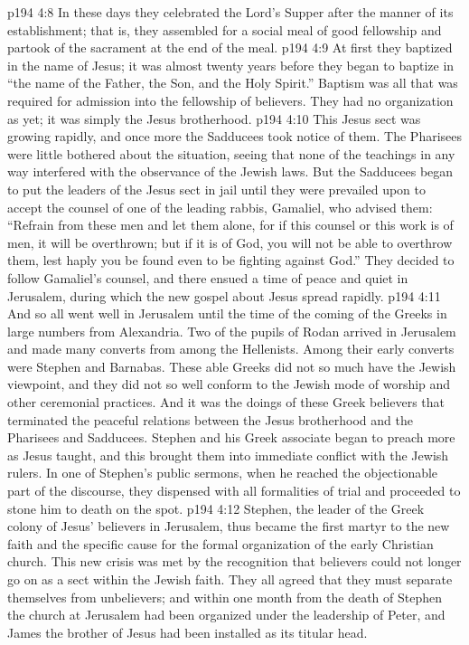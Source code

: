 \vs p194 4:8 \pc In these days they celebrated the Lord’s Supper after the manner of its establishment; that is, they assembled for a social meal of good fellowship and partook of the sacrament at the end of the meal.
\vs p194 4:9 \pc At first they baptized in the name of Jesus; it was almost twenty years before they began to baptize in “the name of the Father, the Son, and the Holy Spirit.” Baptism was all that was required for admission into the fellowship of believers. They had no organization as yet; it was simply the Jesus brotherhood.
\vs p194 4:10 \pc This Jesus sect was growing rapidly, and once more the Sadducees took notice of them. The Pharisees were little bothered about the situation, seeing that none of the teachings in any way interfered with the observance of the Jewish laws. But the Sadducees began to put the leaders of the Jesus sect in jail until they were prevailed upon to accept the counsel of one of the leading rabbis, Gamaliel, who advised them: “Refrain from these men and let them alone, for if this counsel or this work is of men, it will be overthrown; but if it is of God, you will not be able to overthrow them, lest haply you be found even to be fighting against God.” They decided to follow Gamaliel’s counsel, and there ensued a time of peace and quiet in Jerusalem, during which the new gospel about Jesus spread rapidly.
\vs p194 4:11 And so all went well in Jerusalem until the time of the coming of the Greeks in large numbers from Alexandria. Two of the pupils of Rodan arrived in Jerusalem and made many converts from among the Hellenists. Among their early converts were Stephen and Barnabas. These able Greeks did not so much have the Jewish viewpoint, and they did not so well conform to the Jewish mode of worship and other ceremonial practices. And it was the doings of these Greek believers that terminated the peaceful relations between the Jesus brotherhood and the Pharisees and Sadducees. Stephen and his Greek associate began to preach more as Jesus taught, and this brought them into immediate conflict with the Jewish rulers. In one of Stephen’s public sermons, when he reached the objectionable part of the discourse, they dispensed with all formalities of trial and proceeded to stone him to death on the spot.
\vs p194 4:12 Stephen, the leader of the Greek colony of Jesus’ believers in Jerusalem, thus became the first martyr to the new faith and the specific cause for the formal organization of the early Christian church. This new crisis was met by the recognition that believers could not longer go on as a sect within the Jewish faith. They all agreed that they must separate themselves from unbelievers; and within one month from the death of Stephen the church at Jerusalem had been organized under the leadership of Peter, and James the brother of Jesus had been installed as its titular head.
